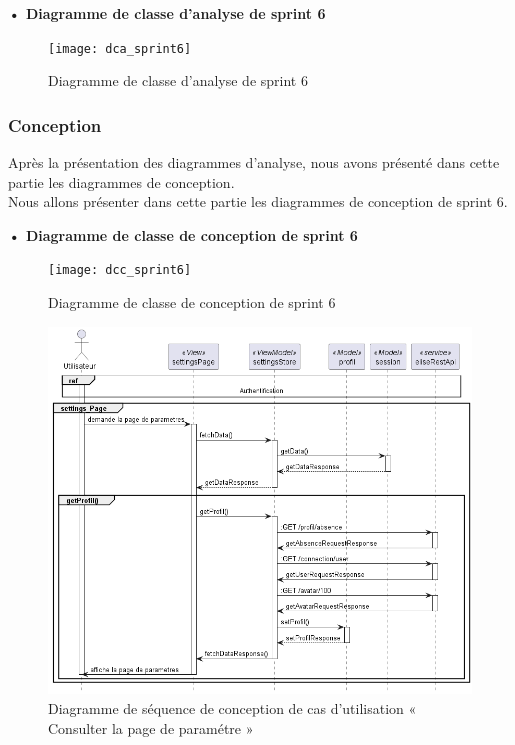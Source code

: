\setlength{\parskip}{1em}
\setlength{\parindent}{0em}

\textbf{•	Diagramme de classe d'analyse de sprint 6 }


\begin{figure}[H]
  \centering
  \texttt{[image: dca\_sprint6]}
  \caption{Diagramme de classe d'analyse de sprint 6}
  \label{fig:class_analyse_sprint6}
\end{figure}


\subsubsection{Conception}

Après la présentation des diagrammes d'analyse, nous avons présenté dans cette partie les diagrammes de conception.\\ 
Nous allons présenter dans cette partie les diagrammes de conception de sprint 6. 
\begin{landscape}

\textbf{•	Diagramme de classe de conception de sprint 6}

\begin{figure}[H]
  \centering
  \texttt{[image: dcc\_sprint6]}
  \caption{Diagramme de classe de conception de sprint 6}
  \label{fig:class_diagram_61}
\end{figure}
\end{landscape}


\begin{figure}[H]
  \centering
  \includegraphics[width=1\textwidth]{out/diagrams/sprint6/sequence_consult_settings_page/sequence_consult_settings_page}
  \caption{Diagramme de séquence de conception de cas d'utilisation « Consulter la page de paramétre »}
  \label{fig:conception_sequence_consult_settings_page}
\end{figure}

